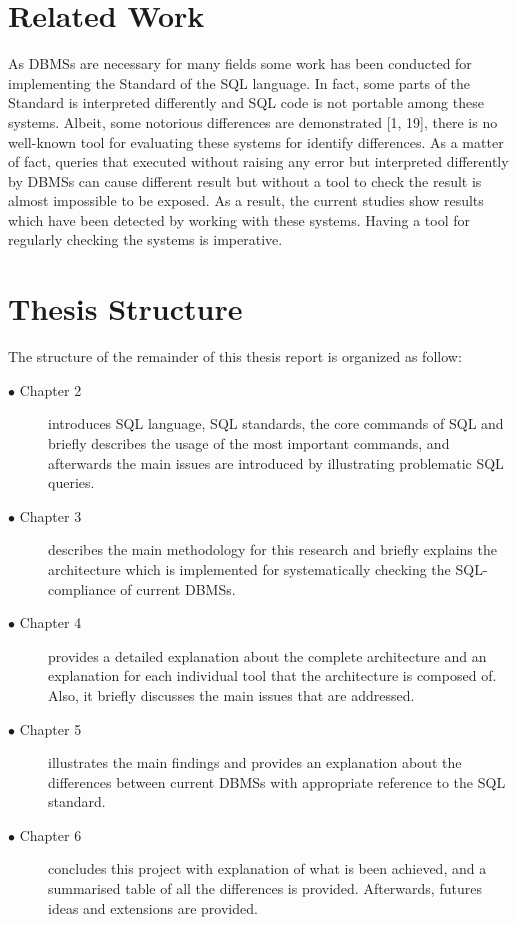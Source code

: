 \section{Related Work}
As DBMSs are necessary for many fields some work has been conducted for implementing the Standard of the SQL language. In fact, some parts of the Standard is interpreted differently and SQL code is not portable among these systems. Albeit, some notorious differences are demonstrated [1, 19], there is no well-known tool for evaluating these systems for identify differences. As a matter of fact, queries that executed without raising any error but interpreted differently by DBMSs can cause different result but without a tool to check the result is almost impossible to be exposed.  As a result, the current studies show results which have been detected by working with these systems. Having a tool for regularly checking the systems is imperative.  

 
 \section{Thesis Structure}

 The structure of the remainder of this thesis report is organized as follow:
 \begin{description}
   \item[$\bullet$ Chapter 2] introduces SQL language, SQL standards, the core commands of SQL and briefly describes the usage of the most important commands, and afterwards the main issues are introduced by illustrating problematic SQL queries. 
   
	\item[$\bullet$ Chapter 3] describes the main methodology for this research and briefly explains the architecture which is implemented for systematically checking the SQL-compliance of current DBMSs.
   
   \item[$\bullet$ Chapter 4] provides a detailed explanation about the complete architecture and an explanation for each individual tool that the architecture is composed of. Also, it briefly discusses the main issues that  are  addressed.

  \item[$\bullet$ Chapter 5] illustrates the main findings and provides an explanation about the differences between current DBMSs with appropriate reference to the SQL standard. 

  \item[$\bullet$ Chapter 6] concludes this project with explanation of what is been achieved, and a summarised table of all the differences is provided. Afterwards, futures ideas and extensions are provided.  
   
\end{description} 

 
 

